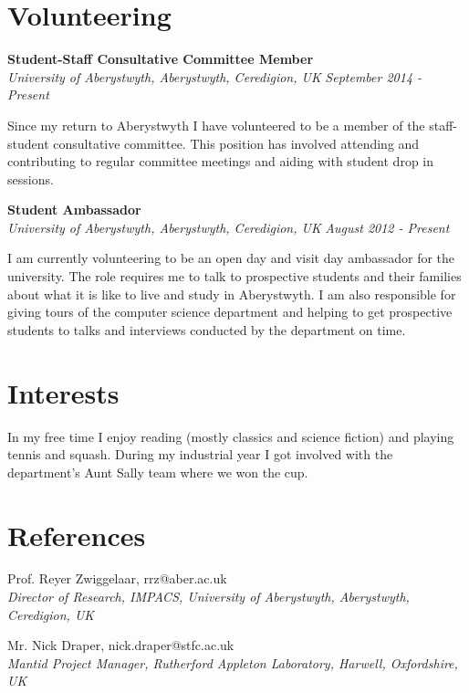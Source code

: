\documentclass[margin,line]{res}
\begin{document}
\begin{resume}
\section{\sc Volunteering}
{\bf Student-Staff Consultative Committee Member} \\
{\it University of Aberystwyth, Aberystwyth, Ceredigion, UK} \hfill {\it September 2014 - Present}

Since my return to Aberystwyth I have volunteered to be a member of the staff-student consultative committee. This position has involved attending and contributing to regular committee meetings and aiding with student drop in sessions.

{\bf Student Ambassador}\\ 
{\it University of Aberystwyth, Aberystwyth, Ceredigion, UK} \hfill {\it August 2012 - Present}

I am currently volunteering to be an open day and visit day ambassador for the university. The role requires me to talk to prospective students and their families about what it is like to live and study in Aberystwyth. I am also responsible for giving tours of the computer science department and helping to get prospective students to talks and interviews conducted by the department on time.

\section{\sc Interests}
In my free time I enjoy reading (mostly classics and science fiction) and playing tennis and squash. During my industrial year I got involved with the department's Aunt Sally team where we won the cup.

\section{\sc References}
Prof. Reyer Zwiggelaar, rrz@aber.ac.uk \\
{\em Director of Research, IMPACS, University of Aberystwyth, Aberystwyth, Ceredigion, UK}

Mr. Nick Draper, nick.draper@stfc.ac.uk \\
{\em Mantid Project Manager, Rutherford Appleton Laboratory, Harwell, Oxfordshire, UK}

\end{resume}
\end{document}
